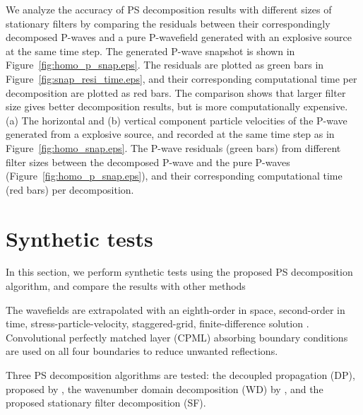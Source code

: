 \documentclass[manuscript,ulem,graphix,revised]{geophysics}
\begin{document}
We analyze the accuracy of PS decomposition results with different sizes of stationary filters by comparing the residuals between their correspondingly decomposed P-waves and a pure P-wavefield generated with an explosive source at the same time step. The generated P-wave snapshot is shown in Figure~\ref{fig:homo_p_snap.eps}. 
The residuals are plotted as green bars in Figure~\ref{fig:snap_resi_time.eps}, and their corresponding computational time per decomposition are plotted as red bars. The comparison shows that larger filter size gives better decomposition results, but is more computationally expensive.
{
(a) The horizontal and (b) vertical component particle velocities of the P-wave generated from a explosive source, and recorded at the same time step as in Figure~\ref{fig:homo_snap.eps}.
}
{
The P-wave residuals (green bars) from different filter sizes between the decomposed P-wave and the pure P-waves (Figure~\ref{fig:homo_p_snap.eps}), and their corresponding computational time (red bars) per decomposition.
}

%
%
\section{Synthetic tests}
\indent\indent
In this section, we perform synthetic tests using the proposed PS decomposition algorithm, and compare the results with other methods

The wavefields are extrapolated with an eighth-order in space, second-order in time, stress-particle-velocity, staggered-grid, finite-difference solution \citep{virieux86}. Convolutional perfectly matched layer (CPML) absorbing boundary conditions \citep{komatitsch07} are used on all four boundaries to reduce unwanted reflections.

Three PS decomposition algorithms are tested: the decoupled propagation (DP), proposed by \citet{ma03}, the wavenumber domain decomposition (WD) by \citet{zhang10}, and the proposed stationary filter decomposition (SF). 
\end{document}
